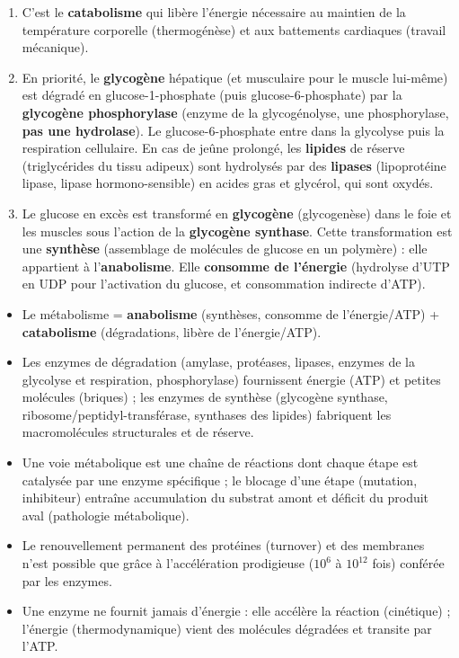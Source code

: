 \documentclass[11pt]{article}
\begin{document}
\begin{corrige}
\begin{enumerate}
\item C'est le \textbf{catabolisme} qui libère l'énergie nécessaire au maintien de la température corporelle (thermogénèse) et aux battements cardiaques (travail mécanique).
\item En priorité, le \textbf{glycogène} hépatique (et musculaire pour le muscle lui-même) est dégradé en glucose-1-phosphate (puis glucose-6-phosphate) par la \textbf{glycogène phosphorylase} (enzyme de la glycogénolyse, une phosphorylase, \textbf{pas une hydrolase}). Le glucose-6-phosphate entre dans la glycolyse puis la respiration cellulaire. En cas de jeûne prolongé, les \textbf{lipides} de réserve (triglycérides du tissu adipeux) sont hydrolysés par des \textbf{lipases} (lipoprotéine lipase, lipase hormono-sensible) en acides gras et glycérol, qui sont oxydés.
\item Le glucose en excès est transformé en \textbf{glycogène} (glycogenèse) dans le foie et les muscles sous l'action de la \textbf{glycogène synthase}. Cette transformation est une \textbf{synthèse} (assemblage de molécules de glucose en un polymère) : elle appartient à l'\textbf{anabolisme}. Elle \textbf{consomme de l'énergie} (hydrolyse d'UTP en UDP pour l'activation du glucose, et consommation indirecte d'ATP).
\end{enumerate}
\end{corrige}

\begin{aretenir}
\begin{itemize}
\item Le métabolisme = \textbf{anabolisme} (synthèses, consomme de l'énergie/ATP) + \textbf{catabolisme} (dégradations, libère de l'énergie/ATP).
\item Les enzymes de dégradation (amylase, protéases, lipases, enzymes de la glycolyse et respiration, phosphorylase) fournissent énergie (ATP) et petites molécules (briques) ; les enzymes de synthèse (glycogène synthase, ribosome/peptidyl-transférase, synthases des lipides) fabriquent les macromolécules structurales et de réserve.
\item Une voie métabolique est une chaîne de réactions dont chaque étape est catalysée par une enzyme spécifique ; le blocage d'une étape (mutation, inhibiteur) entraîne accumulation du substrat amont et déficit du produit aval (pathologie métabolique).
\item Le renouvellement permanent des protéines (turnover) et des membranes n'est possible que grâce à l'accélération prodigieuse ($10^{6}$ à $10^{12}$ fois) conférée par les enzymes.
\item Une enzyme ne fournit jamais d'énergie : elle accélère la réaction (cinétique) ; l'énergie (thermodynamique) vient des molécules dégradées et transite par l'ATP.
\end{itemize}
\end{aretenir}
\end{document}
